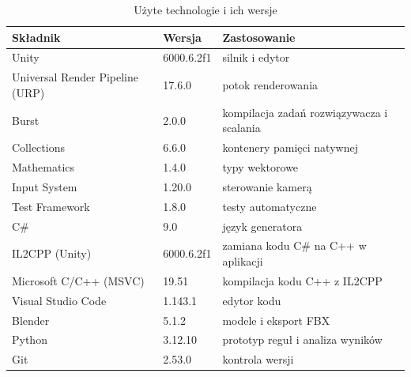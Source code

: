 

\begin{table}
  \centering
  \footnotesize
  \caption{Użyte technologie i ich wersje}
  \label{tab:technologie}
  \begin{tabular}{@{}lll@{}}
    \toprule
    Składnik & Wersja & Zastosowanie \\
    \midrule
    Unity & 6000.6.2f1 & silnik i edytor \\
    Universal Render Pipeline (URP) & 17.6.0 & potok renderowania \\
    Burst & 2.0.0 & kompilacja zadań rozwiązywacza i scalania \\
    Collections & 6.6.0 & kontenery pamięci natywnej \\
    Mathematics & 1.4.0 & typy wektorowe \\
    Input System & 1.20.0 & sterowanie kamerą \\
    Test Framework & 1.8.0 & testy automatyczne \\
    C\# & 9.0 & język generatora \\
    IL2CPP (Unity) & 6000.6.2f1 & zamiana kodu C\# na C++ w aplikacji \\
    Microsoft C/C++ (MSVC) & 19.51 & kompilacja kodu C++ z IL2CPP \\
    Visual Studio Code & 1.143.1 & edytor kodu \\
    Blender & 5.1.2 & modele i eksport FBX \\
    Python & 3.12.10 & prototyp reguł i analiza wyników \\
    Git & 2.53.0 & kontrola wersji \\
    \bottomrule
  \end{tabular}
\end{table}


